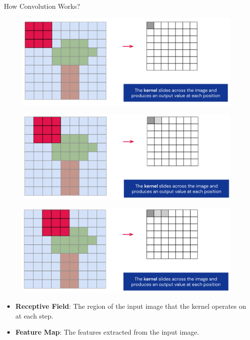 \documentclass[10pt]{beamer}
\theoremstyle{remark}
\theoremstyle{definition}
\begin{document}
\begin{frame}[allowframebreaks]{How Convolution Works?}
\begin{figure}
\centering
\includegraphics[width=1.0\textwidth,height=0.9\textheight,keepaspectratio]{./images/conv_7.png}
\end{figure}

\framebreak

\begin{figure}
\centering
\includegraphics[width=1.0\textwidth,height=0.9\textheight,keepaspectratio]{./images/conv_8.png}
\end{figure}

\framebreak

\begin{figure}
\centering
\includegraphics[width=1.0\textwidth,height=0.9\textheight,keepaspectratio]{./images/conv_9.png}
\end{figure}

\framebreak

\begin{itemize}
\item \textbf{Receptive Field}: The region of the input image that the kernel operates on at each step.
\item \textbf{Feature Map}: The features extracted from the input image.
\end{itemize}


\end{frame}
\end{document}
